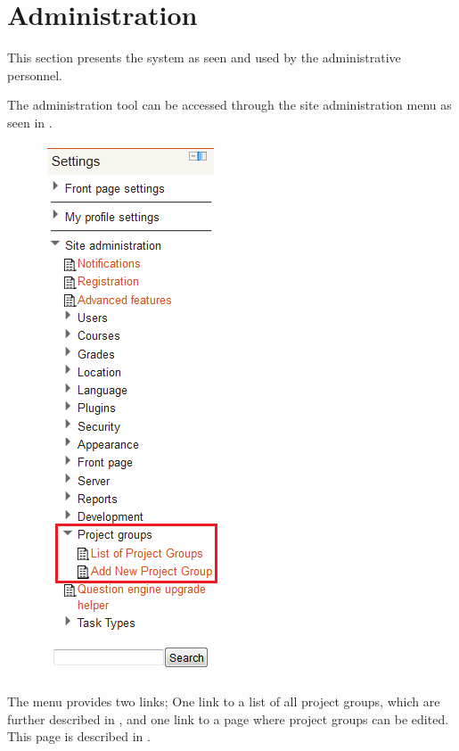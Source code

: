 \FloatBarrier
\section{Administration}
\label{sec:adminPrensentation}
This section presents the system as seen and used by the administrative personnel.

The administration tool can be accessed through the site administration menu as seen in .

\begin{figure}[htb]
	\centering
		\includegraphics[scale=0.6]{images/admin-navigation.png}
	\label{fig:navigation}
\end{figure}
The menu provides two links; One link to a list of all project groups, which are further described in , and one link to a page where project groups can be edited. 
This page is described in .


\FloatBarrier

